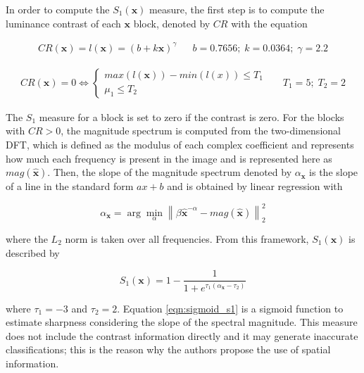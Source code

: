 In order to compute the $S_{1}(\mathbf{x})$ measure, the first step is to compute the luminance contrast of each $\mathbf{x}$ block, denoted by $CR$ with the equation

\begin{align}
\label{eqn:luminance_contrast}
CR(\mathbf{x}) = l(\mathbf{x}) = \left(b + k\mathbf{x}\right)^{\gamma}
&&
b = 0.7656;\; k = 0.0364;\; \gamma = 2.2
\end{align}

\begin{align*}
\label{eqn:contrast_constraints}
CR(\mathbf{x}) = 0 \iff
    \begin{cases}
        max(l(\mathbf{x})) - min(l(x)) \leq T_{1}\\
        \mu_{1} \leq T_{2}    
    \end{cases}
&&
T_{1} = 5;\; T_{2}= 2
\end{align*}

\vspace{0.1in}

\noindent The $S_{1}$ measure for a block is set to zero if the contrast is zero. For the blocks with $CR > 0$, the magnitude spectrum is computed from the two-dimensional DFT, which is defined as the modulus of each complex coefficient and represents how much each frequency is present in the image and is represented here as $mag(\hat{\mathbf{x}})$. Then, the slope of the magnitude spectrum denoted by $\alpha_{\mathbf{x}}$ is the slope of a line in the standard form $ax + b$ and is obtained by linear regression with

\begin{equation}
\label{eqn:slope_of_magnitude}
\alpha_{\mathbf{x}} = \arg \min_{\alpha} \left\lVert \beta \hat{\mathbf{x}}^{-\alpha} -  mag(\hat{\mathbf{x}}) \right\rVert^{2}_{2}
\end{equation}

\noindent where the $L_{2}$ norm is taken over all frequencies. From this framework, $S_{1}(\mathbf{x})$ is described by

\begin{equation}
\label{eqn:sigmoid_s1}
S_{1}(\mathbf{x}) = 1 - \frac{1}{1 + e^{\tau_{1}
(\alpha_{\mathbf{x}} - \tau_{2})}}
\end{equation}

\noindent where $\tau_{1} = -3$ and $\tau_{2} = 2$. Equation \ref{eqn:sigmoid_s1} is a sigmoid function to estimate sharpness considering the slope of the spectral magnitude. This measure does not include the contrast information directly and it may generate inaccurate classifications; this is the reason why the authors propose the use of spatial information.

